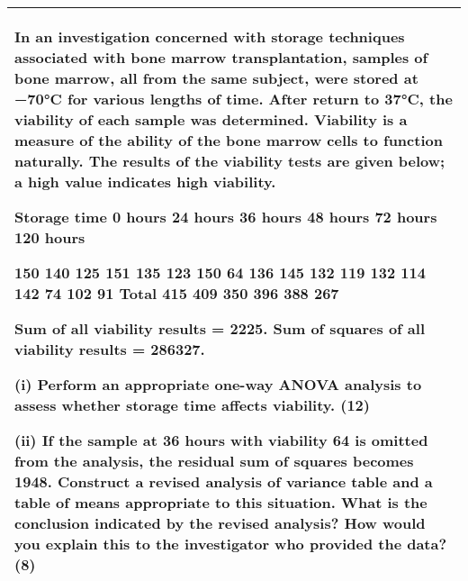 \documentclass[a4paper,12pt]{article}
\begin{document}
\begin{table}[ht!]
 \centering
 \begin{tabular}{|p{15cm}|}
 \hline  
In an investigation concerned with storage techniques associated with bone marrow transplantation, samples of bone marrow, all from the same subject, were stored at −70°C for various lengths of time.  After return to 37°C, the viability of each sample was determined.  Viability is a measure of the ability of the bone marrow cells to function naturally.  The results of the viability tests are given below;  a high value indicates high viability. 
 
Storage time 
0 hours 
24 hours 
36 hours 
48 hours 
72 hours 
120 hours 
 
150 140 125 
151 135 123 
150   64 136 
145 132 119 
132 114 142 
  74 102   91 Total 415 409 350 396 388 267 
 
Sum of all viability results = 2225. Sum of squares of all viability results = 286327. 
 
(i) Perform an appropriate one-way ANOVA analysis to assess whether storage time affects viability. (12) 
 
(ii) If the sample at 36 hours with viability 64 is omitted from the analysis, the residual sum of squares becomes 1948.  Construct a revised analysis of variance table and a table of means appropriate to this situation.  What is the conclusion indicated by the revised analysis?  How would you explain this to the investigator who provided the data? (8) \\ \hline
  \end{tabular}
\end{table}
\end{document}

